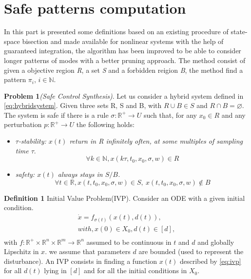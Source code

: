   \section{Safe patterns computation}
  \label{sec:safepatterncomputation}
    In this part is presented some definitions based on an existing 
    procedure of state-space bisection and made available for nonlinear 
    systems  with the help of guaranteed integration, the algorithm has
    been  improved to be able to consider longer patterns of modes with a better
    pruning approach. The method consist of given a objective region 
    \emph{R}, a set \emph{S} and a forbidden reigion \emph{B}, the method find a pattern $\pi_i$, $i \in 
    \mathbb{N}$. \cite{le2016distributed}

    
    \textbf{Problem 1}\emph{(Safe Control Synthesis)}. Let us 
    consider a hybrid system defined in \autoref{eq:hybridsystem}. Given three sets R, S and B, 
    with ${R \cup B \in S}$  and ${R \cap B = \varnothing }$. %
    The system is safe if there is a rule ${\sigma : \mathbb{R}^+ \rightarrow U}$ such that, 
    for any ${x_0 \in R }$ and any perturbation $p : \mathbb{R}^+ \rightarrow U$
    the following holds: 

    \begin{itemize}
        \item \emph{ ${\tau}$-stability: ${x(t)}$ return in R 
        infinitely often, at some multiples of sampling time ${\tau}$}.
        \begin{equation}
          \forall k \in \mathbb{N}, x(k\tau, t_0,x_0,\sigma,w) \in R
        \end{equation}
        \item \emph{ safety: ${x(t)}$ always stays in ${S/B}$.}        
        \begin{equation}
          \forall t \in \mathbb{R}, x(t, t_0,x_0,\sigma,w) \in S, \
          x(t, t_0,x_0,\sigma,w) \notin B
        \end{equation}
    \end{itemize}

    \textbf{Definition 1} Initial Value Problem(IVP). Consider an ODE 
    with a given initial condition.
    \begin{eqnarray*}
      \label{eq:ivp}
      \dot{x} = f_{\sigma(t)}(x(t),d(t)), \\ with,
      x(0) \in X_0, d(t) \in [d], \\      
    \end{eqnarray*}
    with $f:\mathbb{R}^+ \times \mathbb{R}^n \times \mathbb{R}^m \rightarrow \mathbb{R}^n $
    assumed to be continuous in $t$ and $d$ and globally Lipschitz in $x$. we
    assume that parameters $d$ are bounded (used to represent the disturbance).
    An IVP consists in finding a function $x(t)$ described by \autoref{eq:ivp}
    for all $d(t)$ lying in $[d]$ and for all the initial conditions in $X_0$.

